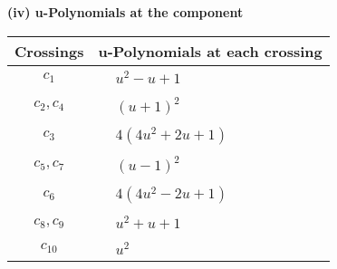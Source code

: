 \documentclass[1p]{elsarticle_modified}
\theoremstyle{definition}
\begin{document}
\newpage\renewcommand{\arraystretch}{1}
\flushleft \textbf{(iv) u-Polynomials at the component}\newline \\
\begin{tabular}{m{50pt}|m{274pt}}
Crossings & \hspace{64pt}u-Polynomials at each crossing \\
\hline $$\begin{aligned}c_{1}\end{aligned}$$&$\begin{aligned}
&u^2- u+1
\end{aligned}$\\
\hline $$\begin{aligned}c_{2},c_{4}\end{aligned}$$&$\begin{aligned}
&(u+1)^2
\end{aligned}$\\
\hline $$\begin{aligned}c_{3}\end{aligned}$$&$\begin{aligned}
&4(4 u^2+2 u+1)
\end{aligned}$\\
\hline $$\begin{aligned}c_{5},c_{7}\end{aligned}$$&$\begin{aligned}
&(u-1)^2
\end{aligned}$\\
\hline $$\begin{aligned}c_{6}\end{aligned}$$&$\begin{aligned}
&4(4 u^2-2 u+1)
\end{aligned}$\\
\hline $$\begin{aligned}c_{8},c_{9}\end{aligned}$$&$\begin{aligned}
&u^2+u+1
\end{aligned}$\\
\hline $$\begin{aligned}c_{10}\end{aligned}$$&$\begin{aligned}
&u^2
\end{aligned}$\\
\hline
\end{tabular}\\~\\
\newpage\renewcommand{\arraystretch}{1}
\end{document}
